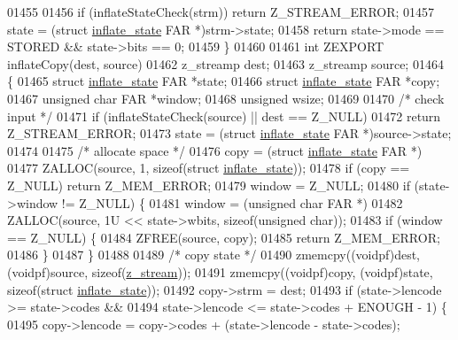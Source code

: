 \begin{DoxyCode}
{{{{{{{{{{{{01455 
01456     \textcolor{keywordflow}{if} (inflateStateCheck(strm)) \textcolor{keywordflow}{return} Z\_STREAM\_ERROR;
01457     state = (\textcolor{keyword}{struct }\hyperlink{structinflate__state}{inflate\_state} FAR *)strm->state;
01458     \textcolor{keywordflow}{return} state->mode == STORED && state->bits == 0;
01459 \}
01460 
01461 \textcolor{keywordtype}{int} ZEXPORT inflateCopy(dest, source)
01462 z\_streamp dest;
01463 z\_streamp source;
01464 \{
01465     \textcolor{keyword}{struct }\hyperlink{structinflate__state}{inflate\_state} FAR *state;
01466     \textcolor{keyword}{struct }\hyperlink{structinflate__state}{inflate\_state} FAR *copy;
01467     \textcolor{keywordtype}{unsigned} \textcolor{keywordtype}{char} FAR *window;
01468     \textcolor{keywordtype}{unsigned} wsize;
01469 
01470     \textcolor{comment}{/* check input */}
01471     \textcolor{keywordflow}{if} (inflateStateCheck(source) || dest == Z\_NULL)
01472         \textcolor{keywordflow}{return} Z\_STREAM\_ERROR;
01473     state = (\textcolor{keyword}{struct }\hyperlink{structinflate__state}{inflate\_state} FAR *)source->state;
01474 
01475     \textcolor{comment}{/* allocate space */}
01476     copy = (\textcolor{keyword}{struct} \hyperlink{structinflate__state}{inflate\_state} FAR *)
01477            ZALLOC(source, 1, \textcolor{keyword}{sizeof}(\textcolor{keyword}{struct} \hyperlink{structinflate__state}{inflate\_state}));
01478     \textcolor{keywordflow}{if} (copy == Z\_NULL) \textcolor{keywordflow}{return} Z\_MEM\_ERROR;
01479     window = Z\_NULL;
01480     \textcolor{keywordflow}{if} (state->window != Z\_NULL) \{
01481         window = (\textcolor{keywordtype}{unsigned} \textcolor{keywordtype}{char} FAR *)
01482                  ZALLOC(source, 1U << state->wbits, \textcolor{keyword}{sizeof}(\textcolor{keywordtype}{unsigned} \textcolor{keywordtype}{char}));
01483         \textcolor{keywordflow}{if} (window == Z\_NULL) \{
01484             ZFREE(source, copy);
01485             \textcolor{keywordflow}{return} Z\_MEM\_ERROR;
01486         \}
01487     \}
01488 
01489     \textcolor{comment}{/* copy state */}
01490     zmemcpy((voidpf)dest, (voidpf)source, \textcolor{keyword}{sizeof}(\hyperlink{structz__stream__s}{z\_stream}));
01491     zmemcpy((voidpf)copy, (voidpf)state, \textcolor{keyword}{sizeof}(\textcolor{keyword}{struct} \hyperlink{structinflate__state}{inflate\_state}));
01492     copy->strm = dest;
01493     \textcolor{keywordflow}{if} (state->lencode >= state->codes &&
01494         state->lencode <= state->codes + ENOUGH - 1) \{
01495         copy->lencode = copy->codes + (state->lencode - state->codes);
}}}}}}}}}}}}
\end{DoxyCode}
